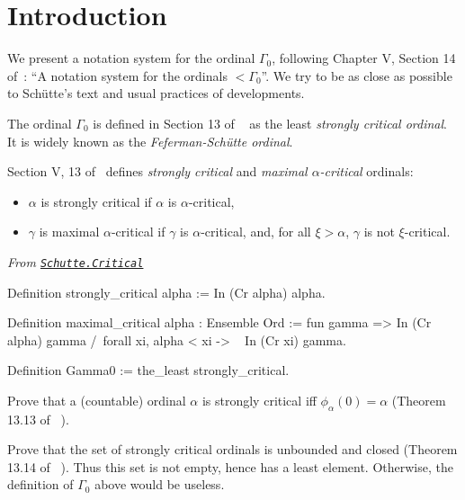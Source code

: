 {\section{Introduction}
We present a notation system for the ordinal $\Gamma_0$, following Chapter V, Section 14 of~\cite{schutte}: ``A notation system for the ordinals $<\Gamma_0$''.
We try to be as close as possible to Schütte's text and usual practices of \coq{} developments.

The ordinal $\Gamma_0$ is defined in Section 13 of ~\cite{schutte} as the least \emph{strongly critical ordinal}. It is widely known as the \emph{Feferman-Schütte ordinal}.


Section V, 13 of~\cite{schutte} defines \emph{strongly critical} and
\emph{maximal $\alpha$-critical} ordinals: 

\begin{itemize}
\item $\alpha$ is strongly critical if
$\alpha$ is $\alpha$-critical,
\item $\gamma$ is maximal $\alpha$-critical if $\gamma$ is $\alpha$-critical, and, for all $\xi>\alpha$, $\gamma$ is not $\xi$-critical.

\end{itemize}





\vspace{4pt}

\noindent\emph{From \href{../theories/html/hydras.Schutte.Critical.html\#strongly_critical}%
{\texttt{Schutte.Critical}}}

\begin{Coqsrc}
Definition strongly_critical alpha := In (Cr alpha) alpha.

Definition maximal_critical alpha : Ensemble Ord :=
  fun gamma =>
    In (Cr alpha) gamma /\
    forall xi, alpha < xi -> ~ In (Cr xi) gamma.

Definition Gamma0 := the_least strongly_critical.
\end{Coqsrc}

\begin{project}
Prove that a (countable)  ordinal $\alpha$ is strongly critical iff 
$\phi_\alpha(0)=\alpha$ (Theorem 13.13 of~\cite{schutte} ). 
\end{project}


\begin{project}
Prove that the set of strongly critical ordinals is unbounded and closed (Theorem 13.14 of~\cite{schutte} ). Thus this set is not empty,  hence has a least element. Otherwise, the definition of $\Gamma_0$ above would be useless.
\end{project}




}
